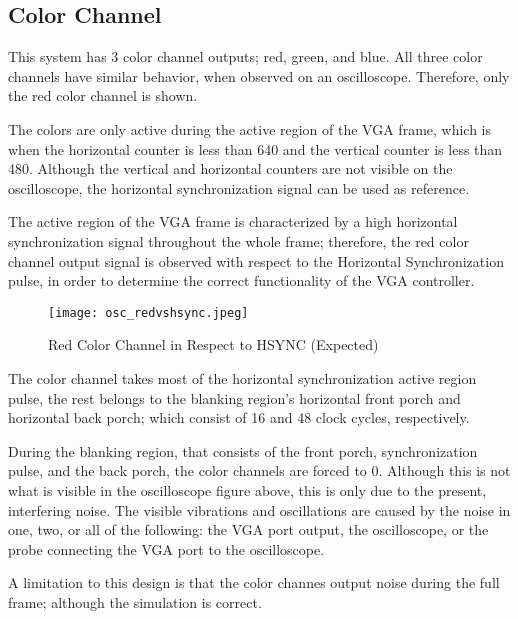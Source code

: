 \subsection{Color Channel}
\par This system has 3 color channel outputs; red, green, and blue. All three color channels have similar behavior, when observed on an oscilloscope. Therefore, only the red color channel is shown. \newline
\par The colors are only active during the active region of the VGA frame, which is when the horizontal counter is less than 640 and the vertical counter is less than 480. Although the vertical and horizontal counters are not visible on the oscilloscope, the horizontal synchronization signal can be used as reference. \newline
\par The active region of the VGA frame is characterized by a high horizontal synchronization signal throughout the whole frame; therefore, the red color channel output signal is observed with respect to the Horizontal Synchronization pulse, in order to determine the correct functionality of the VGA controller. \newline

\begin{figure}[H]
	\centering
	\texttt{[image: osc\_redvshsync.jpeg]}
	\caption{ Red Color Channel in Respect to HSYNC (Expected) }
	\label{fig:osccolor}  
\end{figure}

\par The color channel takes most of the horizontal synchronization active region pulse, the rest belongs to the blanking region's horizontal front porch and horizontal back porch; which consist of 16 and 48 clock cycles, respectively. \newline
\par During the blanking region, that consists of the front porch, synchronization pulse, and the back porch, the color channels are forced to 0. Although this is not what is visible in the oscilloscope figure above, this is only due to the present, interfering noise. The visible vibrations and oscillations are caused by the noise in one, two, or all of the following: the VGA port output, the oscilloscope, or the probe connecting the VGA port to the oscilloscope. \newline
\par A limitation to this design is that the color channes output noise during the full frame; although the simulation is correct. \newline


